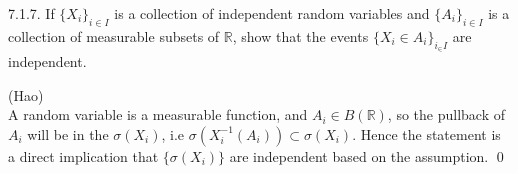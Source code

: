 \begin{exercise} 7.1.7. 
If $\{ X_i\}_{i \in I}$ is a collection of independent random variables and $\{A_i \}_{i \in I}$ is a collection of measurable subsets of $\mathbb{R}$, show that the events $\{X_i \in A_i\}_{i_ \in I}$ are independent. 
\end{exercise}

\begin{answer}
    (Hao) \\
    A random variable is a measurable function, and $A_i \in B(\mathbb{R})$, so the pullback of $A_i$ will be in the $\sigma(X_i)$, i.e $\sigma(X_i^{-1}(A_i)) \subset \sigma(X_i)$. Hence the statement is a direct implication that $\{ \sigma(X_i) \}$ are independent based on the assumption. \qquad \qed
\end{answer}


